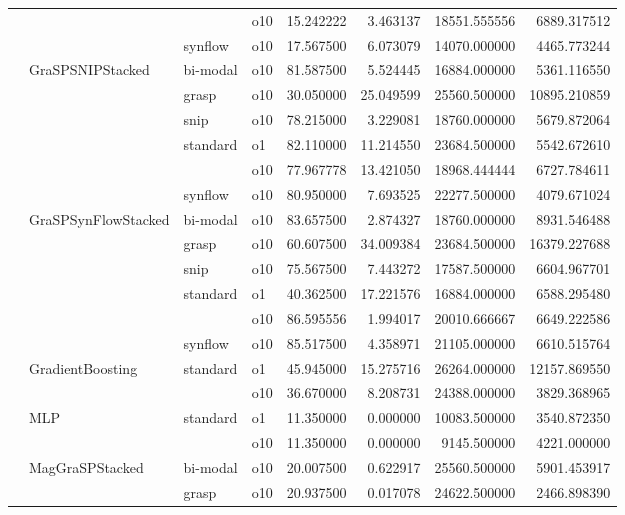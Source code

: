 \begin{longtable}{llllrrrr}
      &     &         & o10 &  15.242222 &   3.463137 &     18551.555556 &   6889.317512 \\
      &     & synflow & o10 &  17.567500 &   6.073079 &     14070.000000 &   4465.773244 \\
      & GraSPSNIPStacked & bi-modal & o10 &  81.587500 &   5.524445 &     16884.000000 &   5361.116550 \\
      &     & grasp & o10 &  30.050000 &  25.049599 &     25560.500000 &  10895.210859 \\
      &     & snip & o10 &  78.215000 &   3.229081 &     18760.000000 &   5679.872064 \\
      &     & standard & o1 &  82.110000 &  11.214550 &     23684.500000 &   5542.672610 \\
      &     &         & o10 &  77.967778 &  13.421050 &     18968.444444 &   6727.784611 \\
      &     & synflow & o10 &  80.950000 &   7.693525 &     22277.500000 &   4079.671024 \\
      & GraSPSynFlowStacked & bi-modal & o10 &  83.657500 &   2.874327 &     18760.000000 &   8931.546488 \\
      &     & grasp & o10 &  60.607500 &  34.009384 &     23684.500000 &  16379.227688 \\
      &     & snip & o10 &  75.567500 &   7.443272 &     17587.500000 &   6604.967701 \\
      &     & standard & o1 &  40.362500 &  17.221576 &     16884.000000 &   6588.295480 \\
      &     &         & o10 &  86.595556 &   1.994017 &     20010.666667 &   6649.222586 \\
      &     & synflow & o10 &  85.517500 &   4.358971 &     21105.000000 &   6610.515764 \\
      & GradientBoosting & standard & o1 &  45.945000 &  15.275716 &     26264.000000 &  12157.869550 \\
      &     &         & o10 &  36.670000 &   8.208731 &     24388.000000 &   3829.368965 \\
      & MLP & standard & o1 &  11.350000 &   0.000000 &     10083.500000 &   3540.872350 \\
      &     &         & o10 &  11.350000 &   0.000000 &      9145.500000 &   4221.000000 \\
      & MagGraSPStacked & bi-modal & o10 &  20.007500 &   0.622917 &     25560.500000 &   5901.453917 \\
      &     & grasp & o10 &  20.937500 &   0.017078 &     24622.500000 &   2466.898390 \\

\end{longtable}
